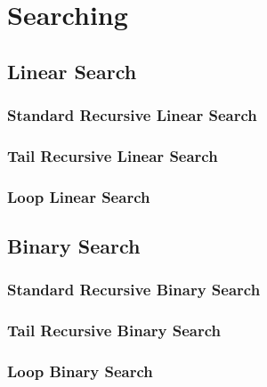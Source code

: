 \section{Searching}

\subsection*{Linear Search}
\subsubsection*{Standard Recursive Linear Search}

\subsubsection*{Tail Recursive Linear Search}

\subsubsection*{Loop Linear Search}


\subsection*{Binary Search}
\subsubsection*{Standard Recursive Binary Search}

\subsubsection*{Tail Recursive Binary Search}

\subsubsection*{Loop Binary Search}